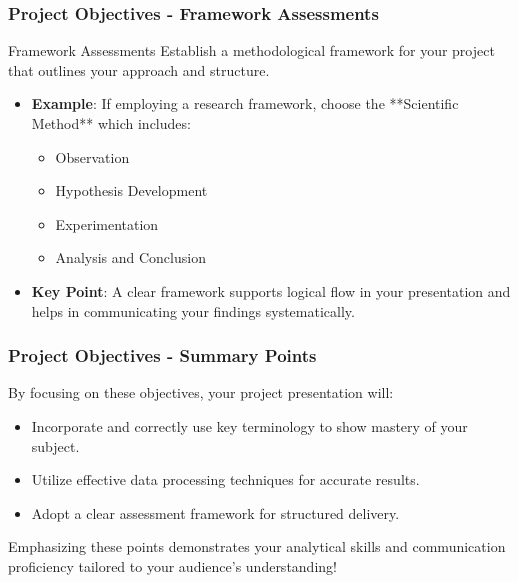 \documentclass[aspectratio=169]{beamer}
\begin{document}
\begin{frame}[fragile]
    \frametitle{Project Objectives - Framework Assessments}
    \begin{block}{Framework Assessments}
        Establish a methodological framework for your project that outlines your approach and structure.
    \end{block}
    
    \begin{itemize}
        \item \textbf{Example}: If employing a research framework, choose the **Scientific Method** which includes:
        \begin{itemize}
            \item Observation
            \item Hypothesis Development
            \item Experimentation
            \item Analysis and Conclusion
        \end{itemize}
        \item \textbf{Key Point}: A clear framework supports logical flow in your presentation and helps in communicating your findings systematically.
    \end{itemize}
\end{frame}

\begin{frame}[fragile]
    \frametitle{Project Objectives - Summary Points}
    By focusing on these objectives, your project presentation will:
    \begin{itemize}
        \item Incorporate and correctly use key terminology to show mastery of your subject.
        \item Utilize effective data processing techniques for accurate results.
        \item Adopt a clear assessment framework for structured delivery.
    \end{itemize}
    
    Emphasizing these points demonstrates your analytical skills and communication proficiency tailored to your audience's understanding!
\end{frame}
\end{document}
